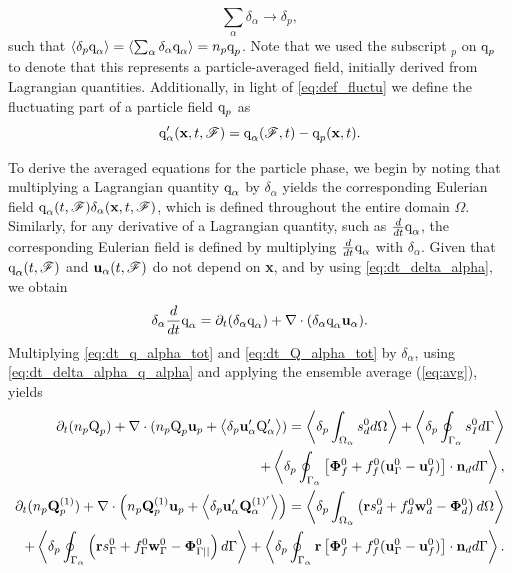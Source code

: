 \begin{equation*}
    \sum_\alpha \delta_\alpha \to \delta_p, 
\end{equation*}
such that $\left<\delta_p \text q_\alpha\right>=\left<\sum_\alpha \delta_\alpha \text q_\alpha\right>=n_p\text q_p$.
Note that we used the subscript $_p$ on $\text q_p$ to denote that this represents a particle-averaged field, initially derived from Lagrangian quantities. 
Additionally, in light of \ref{eq:def_fluctu} we define the fluctuating part of a particle field $\text q_p$ as
\begin{equation}
    \text q_\alpha'(\textbf{x},t,\FF) = \text q_\alpha(\FF,t) - \text q_p(\textbf{x},t). 
    \label{eq:def_fluc_p}
\end{equation}

To derive the averaged equations for the particle phase, we begin by noting that multiplying a Lagrangian quantity $\text q_\alpha$ by $\delta_\alpha$ yields the corresponding Eulerian field  $\text q_\alpha(t,\mathscr{F})\delta_\alpha(\textbf{x},t,\mathscr{F})$, which is defined throughout the entire domain $\Omega$. 
Similarly, for any derivative of a Lagrangian quantity, such as $\frac{d}{dt} \text q_\alpha$, the corresponding Eulerian field is defined by multiplying $\frac{d}{dt} \text q_\alpha$ with $\delta_\alpha$.
Given that $\text q_\alpha(t,\mathscr{F})$ and $\textbf{u}_\alpha(t,\mathscr{F})$ do not depend on \textbf{x}, and by using \ref{eq:dt_delta_alpha}, we obtain
\begin{equation}
    \delta_\alpha \ddt \text q_\alpha
    = \pddt (\delta_\alpha \text q_\alpha)
    + \div (\delta_\alpha \text q_\alpha \textbf{u}_\alpha).
    \label{eq:dt_delta_alpha_q_alpha}
\end{equation}
Multiplying \ref{eq:dt_q_alpha_tot} and \ref{eq:dt_Q_alpha_tot} by $\delta_\alpha$, using \ref{eq:dt_delta_alpha_q_alpha} and applying the ensemble average (\ref{eq:avg}), yields
\begin{align}
    \pddt (n_p\text Q_p)
    + \div (n_p \text Q_p \textbf{u}_p + \pavg{\textbf{u}_\alpha' \text Q_\alpha'})
    = \pOavg{ s_d^0 }
    + \pSavg{ s_I^0 }\nonumber\\
    + \pSavg{ \left[\mathbf{\Phi}_f^0 + f_f^0 (\textbf{u}_\Gamma^0-\textbf{u}_f^0) \right] \cdot \textbf{n}_d },
    \label{eq:avg_dt_dq_alpha_tot}\\
    \pddt (n_p\textbf{Q}_p^{(1)})
    + \div \left(n_p \textbf{Q}_p^{(1)} \textbf{u}_p + \pavg{\textbf{u}_\alpha' \textbf{Q}_\alpha^{(1)'}}\right)
    =\pOavg{ \left(
        \textbf{r} s_d^0         
        + f_d^0  \textbf{w}_d^0 
        - \mathbf{\Phi}_d^0
    \right) }\nonumber\\
    + \pSavg{ \left(
        \textbf{r}s_\Gamma^0
        + f_\Gamma^0 \textbf{w}_\Gamma^0
        - \mathbf{\Phi}_{\Gamma||}^0
    \right) }
    + \pSavg{ \textbf{r} \left[
        \mathbf{\Phi}_f^0
        + f_f^0 (\textbf{u}_\Gamma^0-\textbf{u}_f^0)
    \right]\cdot \textbf{n}_d  }.
    \label{eq:avg_dt_dQ_alpha_tot}
\end{align}

